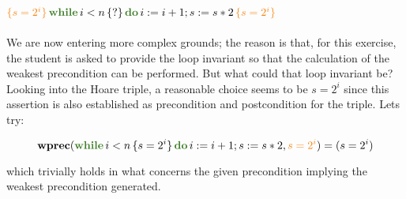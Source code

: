 \documentclass[11pt]{article}
\newcommand{\kw}[1]{{\color{OliveGreen}{#1}}}
\newcommand{\horange}[1]{{\color{BurntOrange}{#1}}}
\newcommand{\hoaret}[3]{{\color{BurntOrange}{\{#1\}}}\,#2\,{\color{BurntOrange}{\{#3\}}}}
\begin{document}
 $\hoaret{s = 2^i}{\textbf{\kw{while}}\,i<n\,\{?\}\,\textbf{\kw{do}}\,i := i +1 ;s := s*2}{s = 2^i}$\\\vspace{0.3cm}\\
We are now entering more complex grounds; the reason is that, for this exercise, the student is asked to provide the loop invariant so that the calculation of the weakest precondition can be performed. But what could that loop invariant be? Looking into the Hoare triple, a reasonable choice seems to be $s = 2^i$ since this assertion is also established as precondition and postcondition for the triple. Lets try:

  $$\textbf{wprec}(\textbf{\kw{while}}\,i<n\,\{s = 2^i\}\,\textbf{\kw{do}}\,i := i +1 ;s := s*2,\horange{s = 2^i}) = (s = 2^i)$$

which trivially holds in what concerns the given precondition implying the weakest precondition generated. \\\vspace{0.2cm}\\ 
\end{document}

